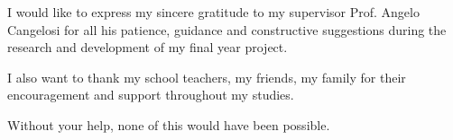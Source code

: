 I would like to express my sincere gratitude to my supervisor Prof. Angelo Cangelosi 
for all his patience, guidance and constructive suggestions during the research and 
development of my final year project. 

I also want to thank my school teachers, my friends, my family for their encouragement 
and support throughout my studies. 

Without your help, none of this would have been possible.


